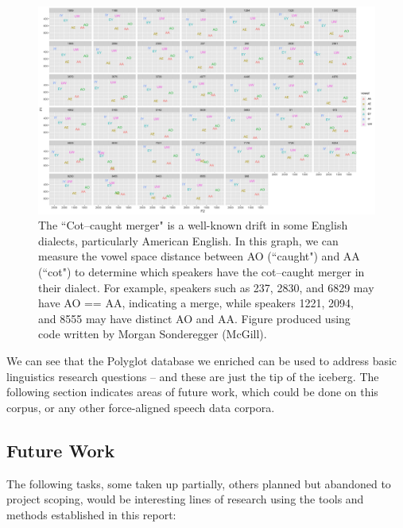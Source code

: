 \documentclass[11pt]{article}
\begin{document}
    \begin{figure}[h]
      \centering
      \includegraphics[scale=0.15]{dialect-analysis.png}
      \caption{The ``Cot--caught merger" is a well-known drift in some English dialects, particularly American English. In this graph, we can measure the vowel space distance between AO (``caught") and AA (``cot") to determine which speakers have the cot--caught merger in their dialect. For example, speakers such as 237, 2830, and 6829 may have AO == AA, indicating a merge, while speakers 1221, 2094, and 8555 may have distinct AO and AA. Figure produced using code written by Morgan Sonderegger (McGill).}
      \label{fig:dialect-analysis}
    \end{figure}

We can see that the Polyglot database we enriched can be used to address basic linguistics research questions -- and these are just the tip of the iceberg. The following section indicates areas of future work, which could be done on this corpus, or any other force-aligned speech data corpora.

\subsection{Future Work}

The following tasks, some taken up partially, others planned but abandoned to project scoping, would be interesting lines of research using the tools and methods established in this report:
\end{document}
